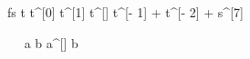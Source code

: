 \begin{eqcode}{f}{s}{}{}
  t \in {} \lend
  t^{[0]}  \lend
  t^{[1]}  \lend
  t^{[\iter]} \gets t^{[\iter - 1]} + t^{[\iter - 2]} + s^{[7]} \lend
   \lend
\end{eqcode}

\begin{eqcode}{\mu}{\ }{\ }{}
  a \in {} \lend
  b  \lend
  a^{[\iter]} \gets \iter \cdot \iter \cdot b \lend
   \lend
   \lend
\end{eqcode}
